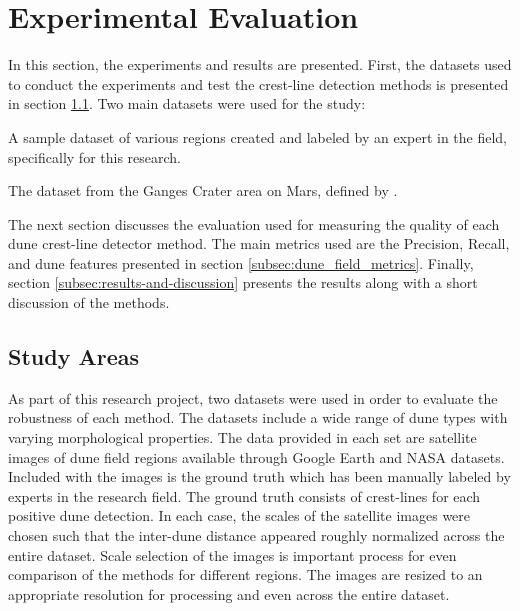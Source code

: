 \section{Experimental Evaluation} \label{sec:experimental_evaluation}

In this section, the experiments and results are presented. First, the datasets used to conduct the experiments and test the crest-line detection methods is presented in section \ref{subsec:study-areas}. Two main datasets were used for the study:

\begin{description}[align=left]
	\item[Terrestrial Dataset] A sample dataset of various regions created and labeled by an expert in the field, specifically for this research.
	\item[Mars Dataset] The dataset from the Ganges Crater area on Mars, defined by \cite{vaz_object_based_dune_analysis}.
\end{description}

The next section discusses the evaluation used for measuring the quality of each dune crest-line detector method. The main metrics used are the Precision, Recall, and dune features presented in section \ref{subsec:dune_field_metrics}. Finally, section \ref{subsec:results-and-discussion} presents the results along with a short discussion of the methods. 

\subsection{Study Areas} \label{subsec:study-areas}

As part of this research project, two datasets were used in order to evaluate the robustness of each method. The datasets include a wide range of dune types with varying morphological properties. The data provided in each set are satellite images of dune field regions available through Google Earth and NASA datasets. Included with the images is the ground truth which has been manually labeled by experts in the research field. The ground truth consists of crest-lines for each positive dune detection. In each case, the scales of the satellite images were chosen such that the inter-dune distance appeared roughly normalized across the entire dataset. Scale selection of the images is important process for even comparison of the methods for different regions. The images are resized to an appropriate resolution for processing and even across the entire dataset.

